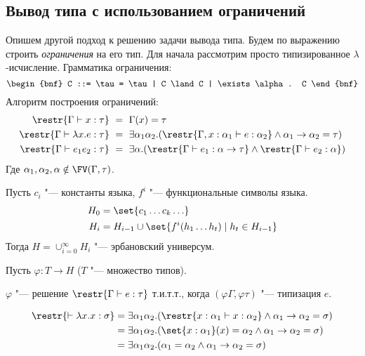 \subsection{\texorpdfstring{Вывод типа с использованием ограничений}{Constraint-based type inference}}

Опишем другой подход к решению задачи вывода типа.
Будем по выражению строить \emph{ограничения} на его тип.
Для начала рассмотрим просто типизированное $\lambda$-исчисление.
Грамматика ограничения:
\[
    \begin{bnf} C ::= \tau = \tau | C \land C | \exists \alpha . C \end{bnf}
\]
Алгоритм построения ограничений:
\begin{align*}
    \restr{\Gamma \vdash x : \tau} \ &=\  \Gamma(x) = \tau \\
    \restr{\Gamma \vdash \lambda x . e : \tau} \ &=\ 
        \exists \alpha_1 \alpha_2 . (\restr{\Gamma, x : \alpha_1\vdash e:\alpha_2} \land \alpha_1\rightarrow\alpha_2=\tau) \\
    \restr{\Gamma \vdash e_1 e_2 : \tau} \ &=\ 
        \exists\alpha.(\restr{\Gamma\vdash e_1 :\alpha\rightarrow\tau} \land \restr{\Gamma\vdash e_2 : \alpha})
\end{align*}
Где $\alpha_1, \alpha_2, \alpha \notin \FV(\Gamma, \tau)$.

\begin{definition}
    Пусть $c_i$ "--- константы языка, $f^i$ "--- функциональные символы языка.
    \begin{align*}
        H_0 &= \set{c_1 \ldots c_k \ldots} \\
        H_i &= H_{i-1} \cup \set{f^i(h_1 \ldots h_t) \mid h_t \in H_{i-1}}
    \end{align*}
    Тогда $H = \cup_{i=0}^{\infty} H_i$ "--- эрбановский универсум.
\end{definition}

Пусть $\varphi : T \rightarrow H$ ($T$ "--- множество типов).

\begin{theorem}
    $\varphi$ "--- решение $\restr{\Gamma\vdash e : \tau}$ т.и.т.т., когда $(\varphi\Gamma, \varphi\tau)$ "--- типизация $e$.
\end{theorem}

\begin{example}
    \begin{align*}
        \restr{\vdash \lambda x . x : \sigma}
        &= \exists \alpha_1 \alpha_2. (\restr{x : \alpha_1 \vdash x : \alpha_2} \land \alpha_1\rightarrow\alpha_2 = \sigma) \\
        &= \exists \alpha_1 \alpha_2. (\set{x : \alpha_1}(x) = \alpha_2 \land \alpha_1\rightarrow\alpha_2 = \sigma) \\
        &= \exists \alpha_1 \alpha_2. (\alpha_1 = \alpha_2 \land \alpha_1\rightarrow\alpha_2 = \sigma)
    \end{align*}
\end{example}


